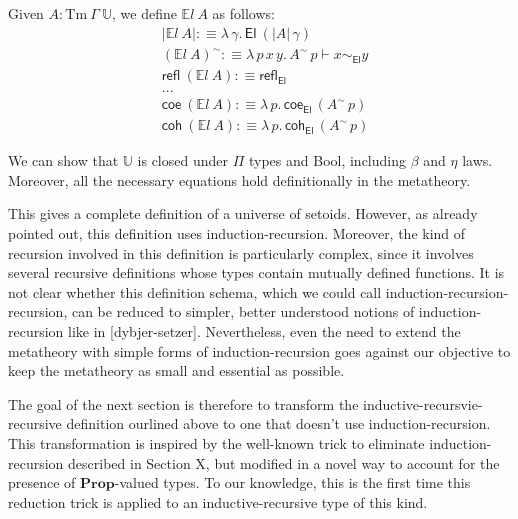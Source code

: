 \documentclass{easychair}
\newcommand{\GG}{\Gamma}
\newcommand{\mProp}{\mathbf{Prop}}
\newcommand{\Tm}{\mathrm{Tm}}
\newcommand{\El}{\textsf{El}}
\newcommand{\Uty}{\mathds{U}}
\newcommand{\EL}{\mathds{E}l}
\newcommand{\reflel}{\textsf{refl}_\El}
\newcommand{\eqel}[3]{#1 \vdash #2 \sim_\El #3}
\begin{document}
Given $A : \Tm\ \GG\ \Uty$, we define $\EL\ A$ as follows:
%
\begin{align*}
  & | \EL\ A | :\equiv \lambda \, \gamma . \, \El\ (| A | \,\gamma) \\
  & (\EL\ A)^\sim :\equiv \lambda \, p \, x \, y . \, \eqel{A^\sim\,p}{x}{y} \\
  & \textsf{refl}\ (\EL\ A) :\equiv \reflel \\
  & ... \\
  & \textsf{coe}\ (\EL\ A) :\equiv \lambda\,p.\, \textsf{coe}_{\El}\,(A^\sim\,p) \\
  & \textsf{coh}\ (\EL\ A) :\equiv \lambda\,p.\, \textsf{coh}_{\El}\,(A^\sim\,p)
\end{align*}

We can show that $\Uty$ is closed under $\Pi$ types and \textsf{Bool}, including
$\beta$ and $\eta$ laws. Moreover, all the necessary equations hold
definitionally in the metatheory.

This gives a complete definition of a universe of setoids. However, as already
pointed out, this definition uses induction-recursion. Moreover, the kind of
recursion involved in this definition is particularly complex, since it involves
several recursive definitions whose types contain mutually defined functions. It
is not clear whether this definition schema, which we could call
induction-recursion-recursion, can be reduced to simpler, better understood
notions of induction-recursion like in [dybjer-setzer]. Nevertheless, even the
need to extend the metatheory with simple forms of induction-recursion goes
against our objective to keep the metatheory as small and essential as possible.

The goal of the next section is therefore to transform the
inductive-recursvie-recursive definition ourlined above to one that doesn't use
induction-recursion.
%
This transformation is inspired by the well-known trick to eliminate
induction-recursion described in Section X, but modified in a novel way to
account for the presence of $\mProp$-valued types. To our knowledge, this is the
first time this reduction trick is applied to an inductive-recursive type of
this kind.

\end{document}
